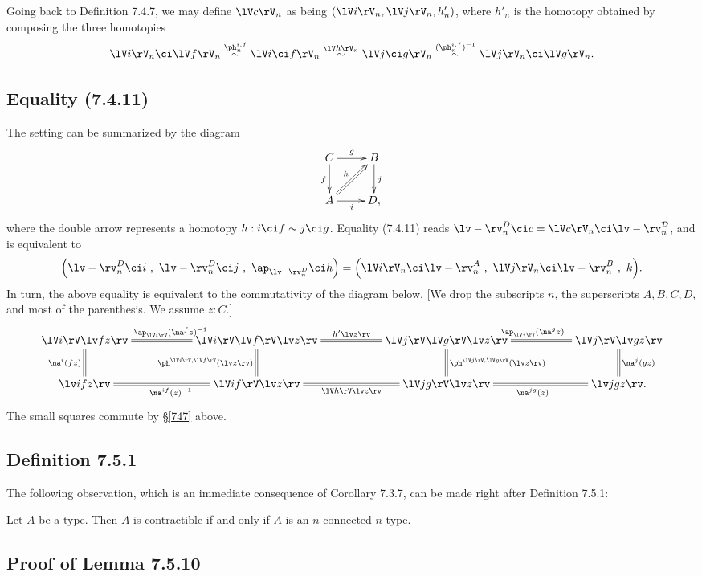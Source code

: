 \documentclass[12pt]{article}
\begin{document}
Going back to Definition 7.4.7, we may define $\lV c\rV_n$ as being $(\lV i\rV_n,\lV j\rV_n,h'_n)$, where $h'_n$ is the homotopy obtained by composing the three homotopies
$$
\lV i\rV_n\ci\lV f\rV_n\overset{\ph_n^{i,f}}{\sim}\lV i\ci f\rV_n\overset{\lV h\rV_n}{\sim}\lV j\ci g\rV_n\overset{(\ph_n^{i,f})^{-1}}{\sim}\lV j\rV_n\ci\lV g\rV_n.
$$


\subsection{Equality (7.4.11)}

The setting can be summarized by the diagram 
$$
\xymatrix{C\ar[r]^g\ar[d]_f&B\ar[d]^j\\ A\ar[r]_i\ar@{=>}[ur]^h&D,}
$$ 
where the double arrow represents a homotopy $h:i\ci f\sim j\ci g$. Equality (7.4.11) reads $\lv-\rv^D_n\ci c=\lV c\rV_n\ci\lv-\rv^{\mathcal D}_n$, and is equivalent to
$$
\Big(\lv-\rv^D_n\ci i\ ,\ \lv-\rv^D_n\ci j\ ,\ \ap_{\lv-\rv^D_n}\ci h\Big)
=
\Big(\lV i\rV_n\ci\lv-\rv^A_n\ ,\ \lV j\rV_n\ci\lv-\rv^B_n\ ,\ k\Big).
$$
In turn, the above equality is equivalent to the commutativity of the diagram below. [We drop the subscripts $n$, the superscripts $A,B,C,D$, and most of the parenthesis. We assume $z:C$.] 
$$ 
\xymatrix{
\lV i\rV\lv fz\rv\ar@{=}[d]_{\na^i(fz)}&&
\lV i\rV\lV f\rV\lv z\rv\ar@{=}[ll]_{\ap_{\lV i\rV}(\na^fz)^{-1}}\ar@{=}[d]_{\ph^{\lV i\rV,\lV f\rV}(\lv z\rv)}\ar@{=}[rr]^{h'\lv z\rv}&&
\lV j\rV\lV g\rV\lv z\rv\ar@{=}[d]^{\ph^{\lV j\rV,\lV g\rV}(\lv z\rv)}\ar@{=}[rr]^{\ap_{\lV j\rV}(\na^gz)}&&
\lV j\rV\lv gz\rv\ar@{=}[d]^{\na^j(gz)}\\
%
\lv ifz\rv&&\lV if\rV\lv z\rv\ar@{=}[rr]_{\lV h\rV\lv z\rv}\ar@{=}[ll]^{\na^{if}(z)^{-1}}&&\lV jg\rV\lv z\rv\ar@{=}[rr]_{\na^{jg}(z)}&&\lv jgz\rv.}
$$ 
The small squares commute by \S\ref{747} above.


\subsection{Definition 7.5.1}\label{751}

The following observation, which is an immediate consequence of Corollary 7.3.7, can be made right after Definition 7.5.1:

Let $A$ be a type. Then $A$ is contractible if and only if $A$ is an $n$-connected $n$-type.


\subsection{Proof of Lemma 7.5.10}
\end{document}
